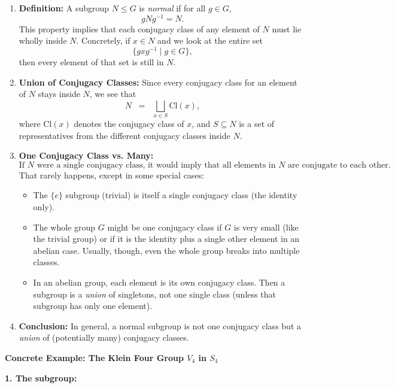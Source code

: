 \documentclass[12pt]{article}
\theoremstyle{definition} %
\theoremstyle{plain} %
\begin{document}
\begin{enumerate}
    \item \textbf{Definition:} 
    A subgroup \(N \le G\) is \emph{normal} if for all \(g \in G\), 
    \[
    gNg^{-1} = N.
    \]
    This property implies that each conjugacy class of any element of \(N\) must lie wholly inside \(N\). Concretely, if \(x \in N\) and we look at the entire set
    \[
    \{g x g^{-1}\;|\; g \in G\},
    \]
    then every element of that set is still in \(N\). 

    \item \textbf{Union of Conjugacy Classes:} 
    Since every conjugacy class for an element of \(N\) stays inside \(N\), we see that 
    \[
    N \;\;=\;\; \bigsqcup_{x \in S} \text{Cl}(x),
    \]
    where \(\text{Cl}(x)\) denotes the conjugacy class of \(x\), and \(S \subseteq N\) is a set of representatives from the different conjugacy classes inside \(N\).

    \item \textbf{One Conjugacy Class vs. Many:} 
    \[
    \text{If }N\text{ were a single conjugacy class, it would imply that all elements in }N\text{ are conjugate to each other.}
    \]
    That rarely happens, except in some special cases:
    \begin{itemize}
        \item The \(\{e\}\) subgroup (trivial) is itself a single conjugacy class (the identity only).
        \item The whole group \(G\) might be one conjugacy class if \(G\) is very small (like the trivial group) or if it is the identity plus a single other element in an abelian case. Usually, though, even the whole group breaks into multiple classes.
        \item In an abelian group, each element is its own conjugacy class. Then a subgroup is a \emph{union} of singletons, not one single class (unless that subgroup has only one element).
    \end{itemize}

    \item \textbf{Conclusion:}
    In general, a normal subgroup is not one conjugacy class but a \emph{union} of (potentially many) conjugacy classes.

\end{enumerate}
\noindent
\textbf{Concrete Example: The Klein Four Group $V_4$ in $S_4$}

\bigskip

\noindent
\textbf{1. The subgroup:}
\end{document}
